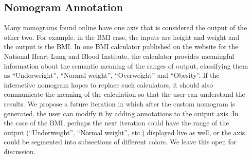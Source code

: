 \documentclass{proc}
\begin{document}
\subsection{Nomogram Annotation}
Many nomograms found online have one axis that is considered the
output of the other two. For example, in the BMI case, the inputs are
height and weight and the output is the BMI. In one BMI calculator
published on the website for the National Heart Lung and Blood
Institute, the calculator provides meaningful information about the
semantic meaning of the ranges of output, classifying them as
``Underweight'', ``Normal weight'', ``Overweight'' and ``Obesity''. If
the interactive nomogram hopes to replace such calculators, it should
also communicate the meaning of the calculation so that the user can
understand the results. We propose a future iteration in which after
the custom nomogram is generated, the user can modify it by adding
annotations to the output axis. In the case of the BMI, perhaps the
next iteration could have the range of the output (``Underweight'',
``Normal weight'', etc.) displayed live as well, or the axis could be
segmented into subsections of different colors. We leave this open for
discussion.


\end{document}

